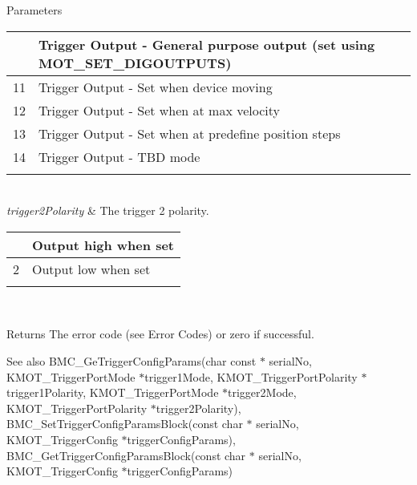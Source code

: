 \begin{DoxyParams}{Parameters}
\begin{tabularx}{\linewidth}{|*{2}{>{\raggedright\arraybackslash}X|}}
10&Trigger Output -\/ General purpose output (set using M\+O\+T\+\_\+\+S\+E\+T\+\_\+\+D\+I\+G\+O\+U\+T\+P\+U\+TS) \\\cline{1-2}
11&Trigger Output -\/ Set when device moving \\\cline{1-2}
12&Trigger Output -\/ Set when at max velocity \\\cline{1-2}
13&Trigger Output -\/ Set when at predefine position steps \\\cline{1-2}
14&Trigger Output -\/ T\+BD mode \\\cline{1-2}
\end{tabularx}
\\
\hline
{\em trigger2\+Polarity} & The trigger 2 polarity.\begin{tabularx}{\linewidth}{|*{2}{>{\raggedright\arraybackslash}X|}}\hline
1&Output high when set \\\cline{1-2}
2&Output low when set \\\cline{1-2}
\end{tabularx}
\\
\hline
\end{DoxyParams}
\begin{DoxyReturn}{Returns}
The error code (see Error Codes) or zero if successful. 
\end{DoxyReturn}
\begin{DoxySeeAlso}{See also}
B\+M\+C\+\_\+\+Ge\+Trigger\+Config\+Params(char const $\ast$ serial\+No, K\+M\+O\+T\+\_\+\+Trigger\+Port\+Mode $\ast$trigger1\+Mode, K\+M\+O\+T\+\_\+\+Trigger\+Port\+Polarity $\ast$trigger1\+Polarity, K\+M\+O\+T\+\_\+\+Trigger\+Port\+Mode $\ast$trigger2\+Mode, K\+M\+O\+T\+\_\+\+Trigger\+Port\+Polarity $\ast$trigger2\+Polarity), B\+M\+C\+\_\+\+Set\+Trigger\+Config\+Params\+Block(const char $\ast$ serial\+No, K\+M\+O\+T\+\_\+\+Trigger\+Config $\ast$trigger\+Config\+Params), B\+M\+C\+\_\+\+Get\+Trigger\+Config\+Params\+Block(const char $\ast$ serial\+No, K\+M\+O\+T\+\_\+\+Trigger\+Config $\ast$trigger\+Config\+Params)


\end{DoxySeeAlso}
